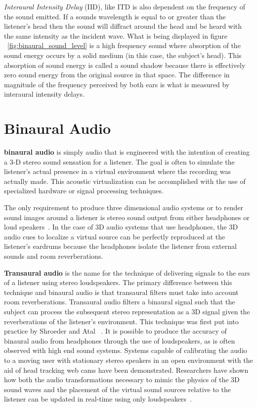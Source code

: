 \textit{Interaural Intensity Delay} (IID), like ITD is also dependent on the
frequency of the sound emitted.  If a sounds wavelength is equal to or greater
than the listener's head then the sound will diffract around the head and be
heard with the same intensity as the incident wave.  What is being displayed in
figure ~\ref{fig:binaural_sound_level} is a high frequency sound where
absorption of the sound energy occurs by a solid medium (in this case, the
subject's head). This absorption of sound energy is called a sound shadow
because there is effectively zero sound energy from the original source in that
space. The  difference in magnitude of the frequency perceived by both ears is
what is  measured by interaural intensity delays.


\section{                  Binaural Audio                                     }

\textbf{binaural audio} is simply audio that is engineered with the intention
of creating a 3-D stereo sound sensation for a listener.  The goal is often to
simulate the listener's actual presence in a virtual environment where the
recording was actually made. This acoustic virtualization can be accomplished
with the use of specialized hardware or signal processing techniques.

The only requirement to produce three dimensional audio systems or to render
sound images around a listener is stereo sound output from either headphones
or loud speakers~\cite{thackara2005bubble}. In the case of 3D audio systems
that use headphones, the 3D audio cues to localize a virtual source can be
perfectly reproduced at the listener's eardrums because the headphones isolate
the listener from external sounds and room reverberations.

\textbf{Transaural audio} is the name for the technique of delivering signals to
the ears of a listener using stereo loudspeakers. The primary difference between
this technique and binaural audio is that transaural filters must take into
account room reverberations.  Transaural audio filters a binaural signal such
that the subject can process the subsequent stereo representation as a 3D signal
given the reverberations of the listener's environment.  This technique was
first put into practice by Shroeder and Atal ~\cite{ schroeder1963computer,
schroeder1970digital }. It is possible to produce the accuracy of binaural audio
from headphones through the use of loudspeakers, as is often observed with high
end sound systems. Systems capable of calibrating the audio to a moving user
with stationary stereo speakers in an open  environment with the aid of head
tracking web cams have been demonstrated. Researchers have shown how both the
audio transformations necessary to mimic the physics of the 3D sound waves and
the placement of the virtual sound sources relative to the listener can be
updated in real-time using only loudspeakers~\cite{song2010personal}.

